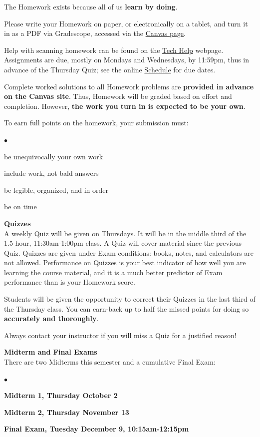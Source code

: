 \documentclass[12pt]{article}
\renewcommand{\emph}[1]{\textsf{\textbf{#1}}}
\newcommand{\localhead}[1]{\par\smallskip\textbf{#1} \smallskip\nobreak\\}%
\def\heading#1{\localhead{\large\emph{#1}}}
\newenvironment{clist}%
{\bgroup\parskip 0pt\begin{list}{$\bullet$}{\partopsep 4pt\topsep 0pt\itemsep -2pt}}%
{\end{list}\egroup}%
\begin{document}
The Homework exists because all of us \textbf{learn by doing}.

Please write your Homework on paper, or electronically on a tablet, and turn it in as a PDF via Gradescope, accessed via the \href{https://canvas.alaska.edu/courses/28364}{Canvas page}.  

Help with scanning homework can be found on the \href{https://uaf-math.github.io/calc2/techHelp.html}{Tech Help} webpage.  Assignments are due, mostly on Mondays and Wednesdays, by 11:59pm, thus in advance of the Thursday Quiz; see the online  \href{https://docs.google.com/spreadsheets/d/e/2PACX-1vTOF-YOVqqB-MTwrxCpTC2GFHkvhlc3OMeVsltm1G4O2OvQQH-1Xhi9aUhZ8M506ZIhe1UIQKlEjSwB/pubhtml?gid=0&single=true}{Schedule} for due dates.  

Complete worked solutions to all Homework problems are \textbf{provided in advance on the Canvas site}.  Thus, Homework will be graded based on {effort} and {completion}. However, \textbf{the work you turn in is expected to be your own}.  

To earn full points on the homework, your submission must:
\vskip -20pt\strut
\begin{clist}
\item be unequivocally your own work
\item include work, not bald answers
\item be legible, organized, and in order
\item be on time
\end{clist}

\heading{Quizzes}
A weekly Quiz will be given on Thursdays.  It will be in the middle third of the 1.5 hour, 11:30am-1:00pm class.  A Quiz will cover material since the previous Quiz.  Quizzes are given under Exam conditions: books, notes, and calculators are not allowed.  Performance on Quizzes is your best indicator of how well you are learning the course material, and it is a much better predictor of Exam performance than is your Homework score.

Students will be given the opportunity to correct their Quizzes in the last third of the Thursday class.  You can earn-back up to half the missed points for doing so \textbf{accurately and thoroughly}.

Always contact your instructor if you will miss a Quiz for a justified reason!  

\heading{Midterm and Final Exams}
There are two Midterms this semester and a cumulative Final Exam:
\vskip -20pt\strut
\begin{clist}
\item \emph{Midterm 1, Thursday October 2}
\item \emph{Midterm 2, Thursday November 13}
\item  \emph{Final Exam, Tuesday December 9, 10:15am-12:15pm}
\end{clist} 
\end{document}
